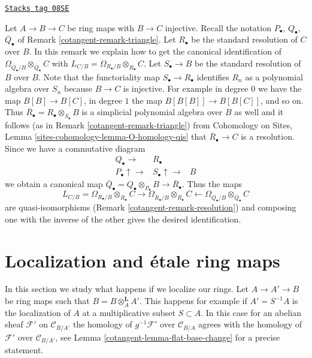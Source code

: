 \begin{remark}
\label{cotangent-remark-explicit-map}
\href{https://stacks.math.columbia.edu/tag/08SE}{\texttt{Stacks tag 08SE}}

Let $A \to B \to C$ be ring maps with $B \to C$ injective.
Recall the notation $P_\bullet$, $Q_\bullet$, $\overline{Q}_\bullet$ of
Remark \ref{cotangent-remark-triangle}.
Let $R_\bullet$ be the standard resolution of $C$ over $B$.
In this remark we explain how to get the canonical identification
of $\Omega_{\overline{Q}_\bullet/B} \otimes_{\overline{Q}_\bullet} C$
with $L_{C/B} = \Omega_{R_\bullet/B} \otimes_{R_\bullet} C$.
Let $S_\bullet \to B$ be the standard resolution of $B$ over $B$.
Note that the functoriality map $S_\bullet \to R_\bullet$ identifies
$R_n$ as a polynomial algebra over $S_n$ because $B \to C$ is injective.
For example in degree $0$ we have the map $B[B] \to B[C]$, in degree
$1$ the map $B[B[B]] \to B[B[C]]$, and so on. Thus
$\overline{R}_\bullet = R_\bullet \otimes_{S_\bullet} B$
is a simplicial polynomial algebra
over $B$ as well and it follows (as in Remark \ref{cotangent-remark-triangle}) from
Cohomology on Sites, Lemma
\ref{sites-cohomology-lemma-O-homology-qis}
that $\overline{R}_\bullet \to C$ is a resolution. Since we have
a commutative diagram
$$
\begin{array}{ccc}Q_\bullet \longrightarrow & R_\bullet &  \\ P_\bullet \uparrow\longrightarrow & S_\bullet \uparrow\longrightarrow & B\end{array}
$$
we obtain a canonical map
$\overline{Q}_\bullet = Q_\bullet \otimes_{P_\bullet} B \to
\overline{R}_\bullet$. Thus the maps
$$
L_{C/B} = \Omega_{R_\bullet/B} \otimes_{R_\bullet} C
\longrightarrow
\Omega_{\overline{R}_\bullet/B} \otimes_{\overline{R}_\bullet} C
\longleftarrow
\Omega_{\overline{Q}_\bullet/B} \otimes_{\overline{Q}_\bullet} C
$$
are quasi-isomorphisms (Remark \ref{cotangent-remark-resolution}) and composing
one with the inverse of the other gives the desired identification.
\end{remark}

\section{Localization and \'etale ring maps}
\label{cotangent-section-localization}
In this section we study what happens if we localize our rings.
Let $A \to A' \to B$ be ring maps such that $B = B \otimes_A^\mathbf{L} A'$.
This happens for example if $A' = S^{-1}A$ is the localization of $A$
at a multiplicative subset $S \subset A$. In this
case for an abelian sheaf $\mathcal{F}'$ on $\mathcal{C}_{B/A'}$
the homology of $g^{-1}\mathcal{F}'$ over $\mathcal{C}_{B/A}$ agrees with
the homology of $\mathcal{F}'$ over $\mathcal{C}_{B/A'}$, see
Lemma \ref{cotangent-lemma-flat-base-change} for a precise statement.

